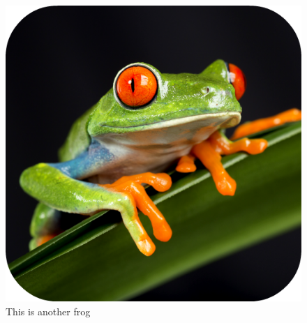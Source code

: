 \begin{apendicesenv}
\label{appendix:frog2}
\begin{figure}[H]
    \centering
    \includegraphics[width=1\textwidth]{figuras/Frog.png}
    \caption{This is another frog}
    \label{fig:frog2}
\end{figure}





\end{apendicesenv}
